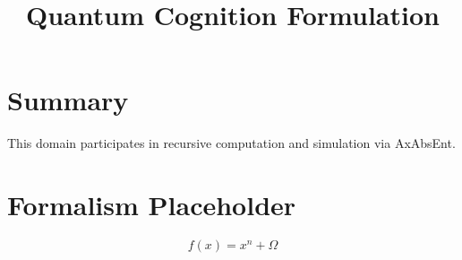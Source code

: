 \documentclass[12pt]{article}
\title{\textbf{Quantum Cognition Formulation}}
\begin{document}
\maketitle

\section*{Summary}
This domain participates in recursive computation and simulation via AxAbsEnt.

\section*{Formalism Placeholder}
\[
f(x) = x^n + \Omega
\]
\end{document}
